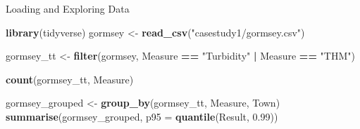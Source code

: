 \documentclass[
  ignorenonframetext,
]{beamer}
\newenvironment{Shaded}{\begin{snugshade}}{\end{snugshade}}
\newcommand{\DataTypeTok}[1]{\textcolor[rgb]{0.13,0.29,0.53}{#1}}
\newcommand{\FloatTok}[1]{\textcolor[rgb]{0.00,0.00,0.81}{#1}}
\newcommand{\KeywordTok}[1]{\textcolor[rgb]{0.13,0.29,0.53}{\textbf{#1}}}
\newcommand{\NormalTok}[1]{#1}
\newcommand{\OperatorTok}[1]{\textcolor[rgb]{0.81,0.36,0.00}{\textbf{#1}}}
\newcommand{\StringTok}[1]{\textcolor[rgb]{0.31,0.60,0.02}{#1}}
\begin{document}
\begin{frame}[fragile]{Loading and Exploring Data}
\protect\hypertarget{loading-and-exploring-data}{}
\begin{Shaded}
\begin{Highlighting}[]
\KeywordTok{library}\NormalTok{(tidyverse)}
\NormalTok{gormsey \textless{}{-}}\StringTok{ }\KeywordTok{read\_csv}\NormalTok{(}\StringTok{"casestudy1/gormsey.csv"}\NormalTok{)}

\NormalTok{gormsey\_tt \textless{}{-}}\StringTok{ }\KeywordTok{filter}\NormalTok{(gormsey, Measure }\OperatorTok{==}\StringTok{ "Turbidity"} \OperatorTok{|}\StringTok{ }\NormalTok{Measure }\OperatorTok{==}\StringTok{ "THM"}\NormalTok{)}

\KeywordTok{count}\NormalTok{(gormsey\_tt, Measure)}

\NormalTok{gormsey\_grouped \textless{}{-}}\StringTok{ }\KeywordTok{group\_by}\NormalTok{(gormsey\_tt, Measure, Town)}
\KeywordTok{summarise}\NormalTok{(gormsey\_grouped, }\DataTypeTok{p95 =} \KeywordTok{quantile}\NormalTok{(Result, }\FloatTok{0.99}\NormalTok{))}
\end{Highlighting}
\end{Shaded}
\end{frame}
\end{document}
